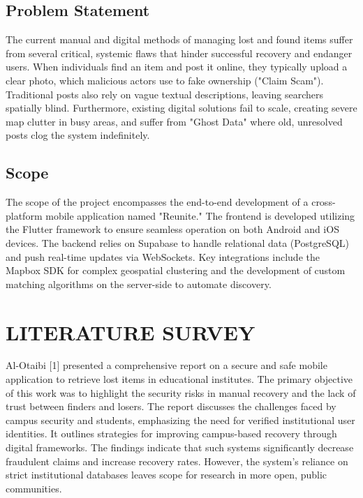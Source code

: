\documentclass[12pt,a4paper]{report}
\begin{document}
\section{Problem Statement}
The current manual and digital methods of managing lost and found items suffer from several critical, systemic flaws that hinder successful recovery and endanger users. When individuals find an item and post it online, they typically upload a clear photo, which malicious actors use to fake ownership ("Claim Scam"). Traditional posts also rely on vague textual descriptions, leaving searchers spatially blind. Furthermore, existing digital solutions fail to scale, creating severe map clutter in busy areas, and suffer from "Ghost Data" where old, unresolved posts clog the system indefinitely.

\section{Scope}
The scope of the project encompasses the end-to-end development of a cross-platform mobile application named "Reunite." The frontend is developed utilizing the Flutter framework to ensure seamless operation on both Android and iOS devices. The backend relies on Supabase to handle relational data (PostgreSQL) and push real-time updates via WebSockets. Key integrations include the Mapbox SDK for complex geospatial clustering and the development of custom matching algorithms on the server-side to automate discovery.

\chapter{LITERATURE SURVEY}

Al-Otaibi [1] presented a comprehensive report on a secure and safe mobile application to retrieve lost items in educational institutes. The primary objective of this work was to highlight the security risks in manual recovery and the lack of trust between finders and losers. The report discusses the challenges faced by campus security and students, emphasizing the need for verified institutional user identities. It outlines strategies for improving campus-based recovery through digital frameworks. The findings indicate that such systems significantly decrease fraudulent claims and increase recovery rates. However, the system's reliance on strict institutional databases leaves scope for research in more open, public communities.
\end{document}
